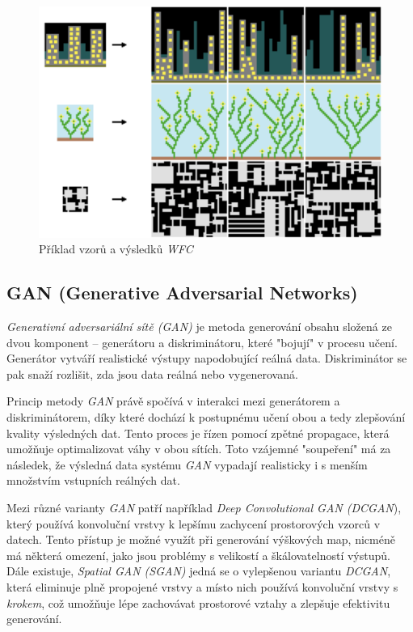 \begin{figure}
  \centering      %
  \includegraphics[scale=0.6]{obr/wfc-examples.png} %
  \caption{Příklad vzorů a výsledků \textit{WFC} \cite{waveClanek}} %
  \label{WFC_priklad} %
\end{figure}

\subsection{GAN (Generative Adversarial Networks)}

\textit{Generativní adversariální sítě (GAN)} je metoda generování obsahu složená ze dvou komponent -- generátoru a diskriminátoru, které "bojují" v procesu učení. Generátor vytváří realistické výstupy napodobující reálná data. Diskriminátor se pak snaží rozlišit, zda jsou data reálná nebo vygenerovaná.

Princip metody \textit{GAN} právě spočívá v interakci mezi generátorem a diskriminátorem, díky které dochází k postupnému učení obou a tedy zlepšování kvality výsledných dat. Tento proces je řízen pomocí zpětné propagace, která umožňuje optimalizovat váhy v obou sítích. Toto vzájemné "soupeření" má za následek, že výsledná data systému \textit{GAN} vypadají realisticky i s menším množstvím vstupních reálných dat.

Mezi různé varianty \textit{GAN} patří například \textit{Deep Convolutional GAN (DCGAN}), který používá konvoluční vrstvy k lepšímu zachycení prostorových vzorců v datech. Tento přístup je možné využít při generování výškových map, nicméně má některá omezení, jako jsou problémy s velikostí a škálovatelností výstupů. Dále existuje, \textit{Spatial GAN (SGAN)} jedná se o vylepšenou variantu \textit{DCGAN}, která eliminuje plně propojené vrstvy a místo nich používá konvoluční vrstvy s \textit{krokem}, což umožňuje lépe zachovávat prostorové vztahy a zlepšuje efektivitu generování. \cite{GANclanek}




